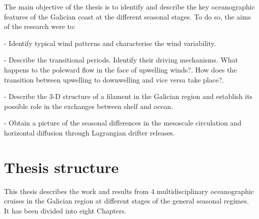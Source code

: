 The main objective of the thesis is to identify and describe the
key oceanographic features of the Galician coast at the different
seasonal stages. To do so, the aims of the research were to:

- Identify typical wind patterns and characterise the wind
variability.

- Describe the transitional periods. Identify their driving
mechanisms. What happens to the poleward flow in the face of
upwelling winds?. How does the transition between upwelling to
downwelling and vice versa take place?.

- Describe the 3-D structure of a filament in the Galician region
and establish its possible role in the exchanges between shelf and
ocean.

- Obtain a picture of the seasonal differences in the mesoscale
circulation and horizontal diffusion through Lagrangian drifter
releases.

\section{Thesis structure}
This thesis describes the work and results from 4
multidisciplinary oceanographic cruises in the Galician region at
different stages of the general seasonal regimes. It has been
divided into eight Chapters.

